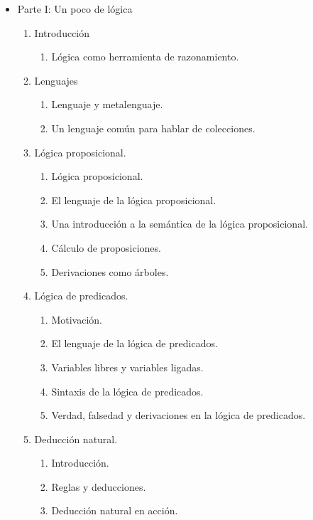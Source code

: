 \documentclass{article}
\begin{document}
\begin{itemize}
    \item Parte I: Un poco de lógica
    \begin{enumerate}
        \item Introducción
        \begin{enumerate}
            \item Lógica como herramienta de razonamiento.
        \end{enumerate}
        \item Lenguajes
        \begin{enumerate}
            \item Lenguaje y metalenguaje.
            \item Un lenguaje común para hablar de colecciones.
        \end{enumerate}
        \item Lógica proposicional.
        \begin{enumerate}
            \item Lógica proposicional.
            \item El lenguaje de la lógica proposicional.
            \item Una introducción a la semántica de la lógica proposicional.
            \item Cálculo de proposiciones.
            \item Derivaciones como árboles.
        \end{enumerate}
        \item Lógica de predicados.
        \begin{enumerate}
            \item Motivación.
            \item El lenguaje de la lógica de predicados.
            \item Variables libres y variables ligadas.
            \item Sintaxis de la lógica de predicados.
            \item Verdad, falsedad y derivaciones en la lógica de predicados.
        \end{enumerate}
        \item Deducción natural.
        \begin{enumerate}
            \item Introducción.
            \item Reglas y deducciones.
            \item Deducción natural en acción.

\end{enumerate}
\end{enumerate}
\end{itemize}
\end{document}
